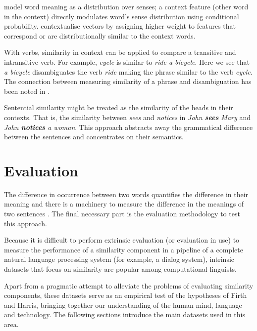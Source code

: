  model word meaning as a distribution over senses; a context feature (other word in the context)  directly modulates word’s sense distribution using conditional probability.  contextualise vectors by assigning higher weight to features that correspond or are distributionally similar to the context words.


With verbs, similarity in context can be applied to compare a transitive and intransitive verb. For example, \textit{cycle} is similar to \textit{ride a bicycle}. Here we see that \textit{a bicycle} disambiguates the verb \textit{ride} making the phrase similar to the verb \textit{cycle}. The connection between measuring similarity of a phrase and disambiguation has been noted in .


Sentential similarity might be treated as the similarity of the heads in their contexts. That is, the similarity between \textit{sees} and \textit{notices} in \textit{John \textbf{sees} Mary} and \textit{John \textbf{notices} a woman}. This approach abstracts away the grammatical difference between the sentences and concentrates on their semantics.

\section{Evaluation}
\label{sec:intrinsic-evaluation}

The difference in occurrence between two words quantifies the difference in their meaning \cite{harris1954distributional} and there is a machinery to measure the difference in the meanings of two sentences \cite{DBLP:journals/corr/abs-1003-4394}. The final necessary part is the evaluation methodology to test this approach.

Because it is difficult to perform extrinsic evaluation (or evaluation in use) to measure the performance of a similarity component in a pipeline of a complete natural language processing system (for example, a dialog system), intrinsic datasets that focus on similarity are popular among computational linguists.

Apart from a pragmatic attempt to alleviate the problems of evaluating
similarity components, these datasets serve as an empirical test of the
hypotheses of Firth and Harris, bringing together our understanding of the human mind, language and technology. The following sections introduce the main datasets used in this area.

